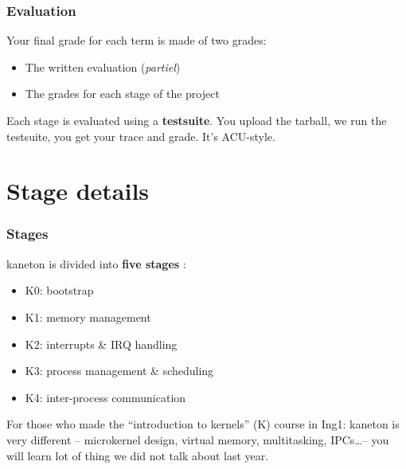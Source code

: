 
\begin{frame}
  \frametitle{Evaluation}

  Your final grade for each term is made of two grades:

  \begin{itemize}
  \item The written evaluation (\emph{partiel})
  \item The grades for each stage of the project
  \end{itemize}

  \-

  Each stage is evaluated using a \textbf{testsuite}. You upload the
  tarball, we run the testsuite, you get your trace and grade. It's
  ACU-style.


\end{frame}

%
%

\section{Stage details}

\begin{frame}
  \frametitle{Stages}

  kaneton is divided into \textbf{five stages} :

  \-

  \begin{itemize}
  \item
    K0: bootstrap
  \item
    K1: memory management
  \item
    K2: interrupts \& IRQ handling
  \item
    K3: process management \& scheduling
  \item
    K4: inter-process communication
  \end{itemize}

  \-

  For those who made the ``introduction to kernels'' (K) course in
  Ing1: kaneton is very different -- microkernel design, virtual
  memory, multitasking, IPCs\ldots -- you will learn lot of thing we
  did not talk about last year.

\end{frame}




